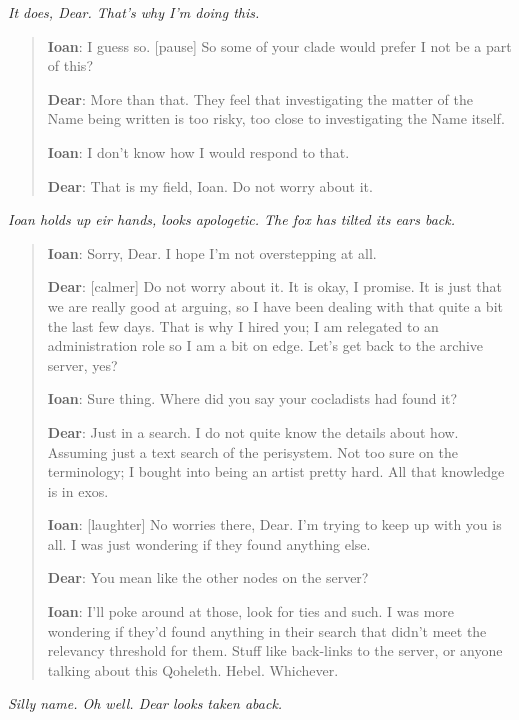 \emph{It does, Dear. That's why I'm doing this.}

\begin{quote}
\textbf{Ioan}: I guess so. {[}pause{]} So some of your clade would prefer I not be a part of this?

\textbf{Dear}: More than that. They feel that investigating the matter of the Name being written is too risky, too close to investigating the Name itself.

\textbf{Ioan}: I don't know how I would respond to that.

\textbf{Dear}: That is my field, Ioan. Do not worry about it.
\end{quote}

\emph{Ioan holds up eir hands, looks apologetic. The fox has tilted its ears back.}

\begin{quote}
\textbf{Ioan}: Sorry, Dear. I hope I'm not overstepping at all.

\textbf{Dear}: {[}calmer{]} Do not worry about it. It is okay, I promise. It is just that we are really good at arguing, so I have been dealing with that quite a bit the last few days. That is why I hired you; I am relegated to an administration role so I am a bit on edge. Let's get back to the archive server, yes?

\textbf{Ioan}: Sure thing. Where did you say your cocladists had found it?

\textbf{Dear}: Just in a search. I do not quite know the details about how. Assuming just a text search of the perisystem. Not too sure on the terminology; I bought into being an artist pretty hard. All that knowledge is in exos.

\textbf{Ioan}: {[}laughter{]} No worries there, Dear. I'm trying to keep up with you is all. I was just wondering if they found anything else.

\textbf{Dear}: You mean like the other nodes on the server?

\textbf{Ioan}: I'll poke around at those, look for ties and such. I was more wondering if they'd found anything in their search that didn't meet the relevancy threshold for them. Stuff like back-links to the server, or anyone talking about this Qoheleth. Hebel. Whichever.
\end{quote}

\emph{Silly name. Oh well. Dear looks taken aback.}

